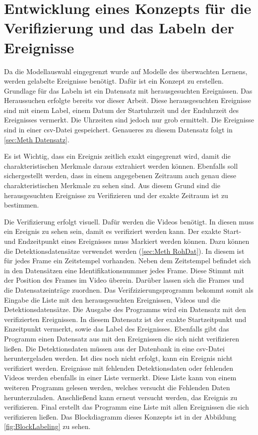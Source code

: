 \section{Entwicklung eines Konzepts für die Verifizierung und das Labeln der Ereignisse} \label{sec:Meth Labeling}
Da die Modellauswahl eingegrenzt wurde auf Modelle des überwachten Lernens, werden gelabelte Ereignisse benötigt. Dafür ist ein Konzept zu erstellen. Grundlage für das Labeln ist ein Datensatz mit herausgesuchten Ereignissen. Das Heraussuchen erfolgte bereits vor dieser Arbeit. Diese herausgesuchten Ereignisse sind mit einem Label, einem Datum der Startuhrzeit und der Enduhrzeit des Ereignisses vermerkt. Die Uhrzeiten sind jedoch nur grob ermittelt. Die Ereignisse sind in einer csv-Datei gespeichert. Genaueres zu diesem Datensatz folgt in  \ref{sec:Meth Datensatz}. \par

Es ist Wichtig, dass ein Ereignis zeitlich exakt eingegrenzt wird, damit die charakteristischen Merkmale daraus extrahiert werden können. Ebenfalls soll sichergestellt werden, dass in einem angegebenen Zeitraum auch genau diese charakteristischen Merkmale zu sehen sind. Aus diesem Grund sind die herausgesuchten Ereignisse zu Verifizieren und der exakte Zeitraum ist zu bestimmen. \par 

Die Verifizierung erfolgt visuell. Dafür werden die Videos benötigt. In diesen muss ein Ereignis zu sehen sein, damit es verifiziert werden kann. Der exakte Start- und Endzeitpunkt eines Ereignisses muss Markiert werden können. Dazu können die Detektionsdatensätze verwendet werden (\ref{sec:Meth RohDat}). In diesem ist für jedes Frame ein Zeitstempel vorhanden. Neben dem Zeitstempel befindet sich in den Datensätzen eine Identifikationsnummer jedes Frame. Diese Stimmt mit der Position des Frames im Video überein. Darüber lassen sich die Frames und die Datensatzeinträge zuordnen. Das Verifzizierungsprogramm bekommt somit als Eingabe die Liste mit den herausgesuchten Ereignissen, Videos und die Detektionsdatensätze. Die Ausgabe des Programms wird ein Datensatz mit den verifizierten Ereignissen. In diesem Datensatz ist der exakte Startzeitpunkt und Enzeitpunkt vermerkt, sowie das Label des Ereignisses. Ebenfalls gibt das Programm einen Datensatz aus mit den Ereignissen die sich nicht verifizieren ließen. Die Detektionsdaten müssen aus der Datenbank in eine csv-Datei heruntergeladen werden. Ist dies noch nicht erfolgt, kann ein Ereignis nicht verifiziert werden. Ereignisse mit fehlenden Detektionsdaten oder fehlenden Videos werden ebenfalls in einer Liste vermerkt. Diese Liste kann von einem weiteren Programm gelesen werden, welches versucht die Fehlenden Daten herunterzuladen. Anschließend kann erneut versucht werden, das Ereignis zu verifizieren. Final erstellt das Programm eine Liste mit allen Ereignissen die sich verifizieren ließen. Das Blockdiagramm dieses Konzepts ist in der Abbildung \ref{fig:BlockLabeling} zu sehen. 

